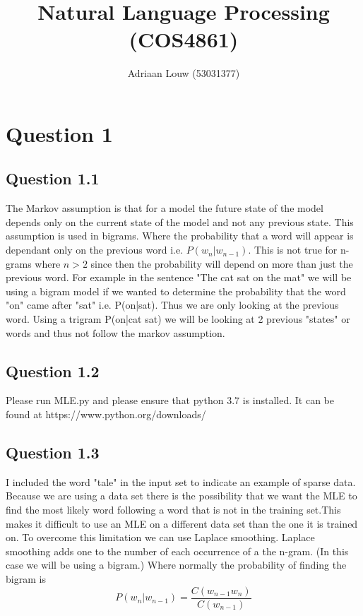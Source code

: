 \documentclass[10pt,a4paper]{article}
\title{Natural Language Processing (COS4861)}
\author{Adriaan Louw (53031377)}
\begin{document}
\maketitle

\section{Question 1}
\subsection{Question 1.1}
The Markov assumption is that for a model the future state of the model depends only on the current state of the model and not any previous state. This assumption is used in bigrams. Where the probability that a word will appear is dependant only on the previous word i.e. $P(w_n|w_{n-1})$. This is not true for n-grams where $n >2$ since then the probability will depend on more than just the previous word. For example in the sentence "The cat sat on the mat" we will be using a bigram model if we wanted to determine the probability that the word "on" came after "sat" i.e. P(on|sat). Thus we are only looking at the previous word. Using a trigram P(on|cat sat) we will be looking at 2 previous "states" or words and thus not follow the markov assumption.

\subsection{Question 1.2}
Please run MLE.py and please ensure that python 3.7 is installed. It can be
found at https://www.python.org/downloads/

\subsection{Question 1.3}

I included the word "tale" in the input set to indicate an example of sparse data. Because we are using a data set there is the possibility that we want the MLE to find the most likely word following a word that is not in the training set.This makes it difficult to use an MLE on a different data set than the one it is trained on. To overcome this limitation we can use Laplace smoothing. Laplace smoothing adds one to the number of each occurrence of a the n-gram. (In this case we will be using a bigram.) Where normally the probability of finding the bigram is
\begin{equation}
P(w_n|w_{n-1}) = \frac{C(w_{n-1}w_n)}{C(w_{n-1})}
\end{equation} 
\end{document}
